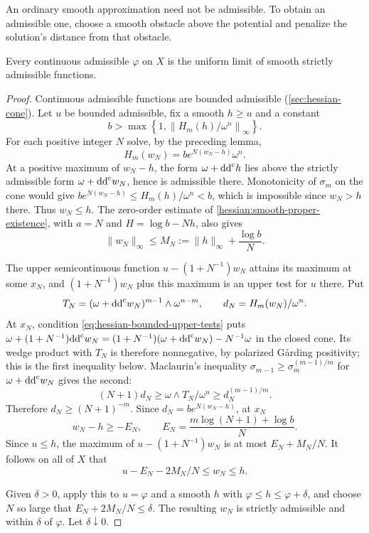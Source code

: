 An ordinary smooth approximation need not be admissible. To obtain an
admissible one, choose a smooth obstacle above the potential and
penalize the solution's distance from that obstacle.

\begin{lemma}\label{hessian:continuous-smooth-approximation}
Every continuous admissible $\varphi$ on $X$ is the uniform limit of
smooth strictly admissible functions.
\end{lemma}
\begin{proof}
Continuous admissible functions are bounded admissible
(\cref{sec:hessian-cone}). Let $u$ be bounded admissible, fix a smooth
$h\geq u$ and a constant
\[
 b>\max\left\{1,\left\|H_m(h)/\omega^n\right\|_\infty\right\}.
\]
For each positive integer $N$ solve, by the preceding lemma,
\[
 H_m(w_N)=b e^{N(w_N-h)}\omega^n.
\]
At a positive maximum of $w_N-h$, the form $\omega+\mathrm{dd}^{\mathrm{c}} h$ lies above
the strictly admissible form $\omega+\mathrm{dd}^{\mathrm{c}} w_N$, hence is admissible there.
Monotonicity of $\sigma_m$ on the cone would give
$b e^{N(w_N-h)}\leq H_m(h)/\omega^n<b$, which is impossible since
$w_N>h$ there.
Thus $w_N\leq h$. The zero-order estimate of
\cref{hessian:smooth-proper-existence}, with $a=N$ and $H=\log b-Nh$,
also gives
\[
 \|w_N\|_\infty\leq M_N:=\|h\|_\infty+\frac{\log b}{N}.
\]

The upper semicontinuous function $u-(1+N^{-1})w_N$ attains its
maximum at some $x_N$, and $(1+N^{-1})w_N$ plus this maximum is an
upper test for $u$ there. Put
\[
 T_N=(\omega+\mathrm{dd}^{\mathrm{c}} w_N)^{m-1}\wedge\omega^{n-m},
 \qquad d_N=H_m(w_N)/\omega^n.
\]
At $x_N$, condition \eqref{eq:hessian-bounded-upper-tests} puts
$\omega+(1+N^{-1})\mathrm{dd}^{\mathrm{c}} w_N=(1+N^{-1})(\omega+\mathrm{dd}^{\mathrm{c}} w_N)-N^{-1}\omega$
in the closed cone. Its wedge product with $T_N$ is therefore
nonnegative, by polarized G\aa rding positivity; this is the first
inequality below. Maclaurin's inequality
$\sigma_{m-1}\geq\sigma_m^{(m-1)/m}$ for $\omega+\mathrm{dd}^{\mathrm{c}} w_N$ gives the
second:
\[
 (N+1)d_N\geq\omega\wedge T_N/\omega^n
                           \geq d_N^{(m-1)/m}.
\]
Therefore $d_N\geq(N+1)^{-m}$. Since $d_N=be^{N(w_N-h)}$, at $x_N$
\[
 w_N-h\geq-E_N,\qquad
 E_N=\frac{m\log(N+1)+\log b}{N}.
\]
Since $u\leq h$, the maximum of $u-(1+N^{-1})w_N$ is at most
$E_N+M_N/N$. It follows on all of $X$ that
\begin{equation}\label{eq:hessian-penalty-squeeze}
 u-E_N-2M_N/N\leq w_N\leq h.
\end{equation}

Given $\delta>0$, apply this to $u=\varphi$ and a smooth $h$ with
$\varphi\leq h\leq\varphi+\delta$, and choose $N$ so large that
$E_N+2M_N/N\leq\delta$. The resulting $w_N$ is strictly admissible
and within $\delta$ of $\varphi$. Let $\delta\downarrow0$.
\end{proof}


